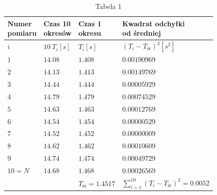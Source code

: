 \documentclass{fizykalab}
\begin{document}
{  \begin{table}[!ht]
	  \centering
	  \begin{tabular}{|l | l | l | l|}
		  \hline
		  \rule{0pt}{4ex}\makecell{Numer                                                                                  \\ pomiaru} & \makecell{Czas 10 \\ okresów} & \makecell{Czas 1 \\ okresu} & \makecell{Kwadrat odchyłki \\ od średniej} \\ [0.5ex]
		  \hline\hline
		  \rule{0pt}{3ex}$i$ & $10 \ T_i[s]$ & $T_i[s]$               & $(T_i - T_\text{śr})^2[s^2]$                      \\
		  \hline
		  $1$                & $14.08$       & $1.408$                & $0.00190969$                                      \\
		  \hline
		  $2$                & $14.13$       & $1.413$                & $0.00149769$                                      \\
		  \hline
		  $3$                & $14.44$       & $1.444$                & $0.00005929$                                      \\
		  \hline
		  $4$                & $14.79$       & $1.479$                & $0.00074529$                                      \\
		  \hline
		  $5$                & $14.63$       & $1.463$                & $0.00012769$                                      \\
		  \hline
		  $6$                & $14.54$       & $1.454$                & $0.00000529$                                      \\
		  \hline
		  $7$                & $14.52$       & $1.452$                & $0.00000009$                                      \\
		  \hline
		  $8$                & $14.62$       & $1.462$                & $0.00010609$                                      \\
		  \hline
		  $9$                & $14.74$       & $1.474$                & $0.00049729$                                      \\
		  \hline
		  $10 = N$           & $14.68$       & $1.468$                & $0.00026569$                                      \\
		  \hline
		  \rule{0pt}{3ex}    &               & $T_\text{śr} = 1.4517$ & $\sum_{i=1}^{10}{(T_i - T_\text{śr})^2} = 0.0052$ \\ [0.5ex]
		  \hline
	  \end{tabular}
	  \caption*{Tabela 1}
  \end{table}

}
\end{document}
